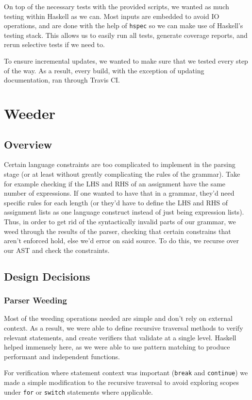 \documentclass[11pt]{article}
\begin{document}
On top of the necessary tests with the provided scripts, we wanted as much
testing within Haskell as we can. Most inputs are embedded to avoid IO operations, and are done with the help of \texttt{hspec} so we can make use of Haskell's testing stack. This allows us to easily run all tests,
generate coverage reports, and rerun selective tests if we need to.

To ensure incremental updates, we wanted to make sure that we tested every step of the way. As a result, every build, with the exception of updating documentation, ran through Travis CI.

\section{Weeder}
\subsection{Overview}
Certain language constraints are too complicated to implement in the
parsing stage (or at least without greatly complicating the rules of
the grammar). Take for example checking if the LHS and RHS of an
assignment have the same number of expressions. If one wanted to have
that in a grammar, they'd need specific rules for each length (or
they'd have to define the LHS and RHS of assignment lists as one
language construct instead of just being expression lists). Thus, in
order to get rid of the syntactically invalid parts of our grammar, we
weed through the results of the parser, checking that certain
constrains that aren't enforced hold, else we'd error on said
source. To do this, we recurse over our AST and check the constraints.
\subsection{Design Decisions}
\subsubsection{Parser Weeding}
Most of the weeding operations needed are simple and don't rely on
external context. As a result, we were able to define recursive
traversal methods to verify relevant statements, and create verifiers
that validate at a single level. Haskell helped immensely here, as we
were able to use pattern matching to produce performant and
independent functions.

For verification where statement context was important (\texttt{break}
and \texttt{continue}) we made a simple modification to the recursive
traversal to avoid exploring scopes under \texttt{for} or
\texttt{switch} statements where applicable.
\end{document}

